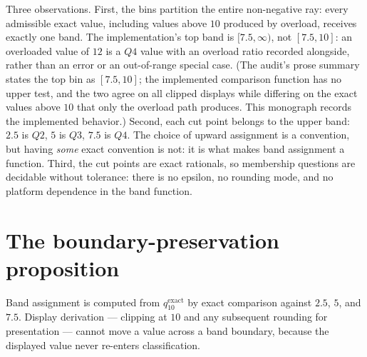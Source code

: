 Three observations. First, the bins partition the entire non-negative ray:
every admissible exact value, including values above $10$ produced by
overload, receives exactly one band. The implementation's top band is
$[7.5, \infty)$, not $[7.5, 10]$: an overloaded value of $12$ is a $Q4$
value with an overload ratio recorded alongside, rather than an error or an
out-of-range special case. (The audit's prose summary states the top bin as
$[7.5, 10]$; the implemented comparison function has no upper test, and the
two agree on all clipped displays while differing on the exact values above
$10$ that only the overload path produces. This monograph records the
implemented behavior.) Second, each cut point belongs to the upper band:
$2.5$ is $Q2$, $5$ is $Q3$, $7.5$ is $Q4$. The choice of upward assignment
is a convention, but having \emph{some} exact convention is not: it is what
makes band assignment a function. Third, the cut points are exact rationals,
so membership questions are decidable without tolerance: there is no
epsilon, no rounding mode, and no platform dependence in the band function.

\section{The boundary-preservation proposition}\label{ch08:sec:boundary}

\begin{proposition}\label{ch08:prop:boundary}
Band assignment is computed from $q_{10}^{\mathrm{exact}}$ by exact
comparison against $2.5$, $5$, and $7.5$. Display derivation --- clipping at
$10$ and any subsequent rounding for presentation --- cannot move a value
across a band boundary, because the displayed value never re-enters
classification.
\end{proposition}

